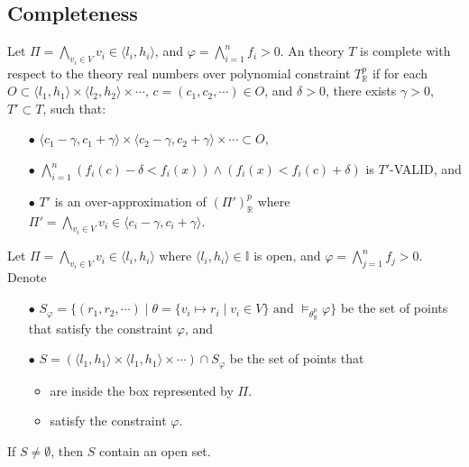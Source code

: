 \subsection{Completeness}
\begin{definition} \label{def:OT-complete}
\sloppy
Let $\Pi = \bigwedge\limits_{v_i \in V} v_i \in \langle l_i, h_i \rangle$, and ${\varphi = \bigwedge\limits_{i=1}^n f_i > 0}$. An theory $T$ is complete with respect to the theory real numbers over polynomial constraint $T^p_\mathbb{R}$ if for each ${O \subset \langle l_1, h_1 \rangle \times \langle l_2, h_2 \rangle \times \cdots}$, ${c = (c_1, c_2, \cdots) \in O}$, and $\delta > 0$, there exists $\gamma > 0$, $T' \subset T$, such that:
\begin{itemize}
\item[$\bullet$] $\langle c_1 - \gamma, c_1 + \gamma \rangle \times \langle c_2 - \gamma, c_2 + \gamma \rangle \times \cdots \subset O$,
\item[$\bullet$]$\bigwedge\limits_{i=1}^n(f_i(c)-\delta < f_i(x)) \wedge (f_i(x) < f_i(c) + \delta)$ is $T'$-VALID, and
\item[$\bullet$] $T'$ is an over-approximation of $(\Pi')^p_\mathbb{R}$ where ${\Pi' = \bigwedge\limits_{v_i \in V} v_i \in \langle c_i - \gamma, c_i + \gamma \rangle}$.
\end{itemize} 
\end{definition}

\begin{lemma} \label{lem:sat-complete}
Let $\Pi = \bigwedge\limits_{v_i \in V} v_i \in \langle l_i, h_i \rangle$ where $\langle l_i, h_i \rangle \in \mathbb{I}$ is open, and ${\varphi = \bigwedge\limits_{j = 1}^n f_j > 0}$. Denote 
\begin{itemize}
\item [$\bullet$] $S_\varphi = \{(r_1, r_2, \cdots) \mid \theta = \{v_i \mapsto r_i \mid v_i \in V \} \text{ and } \models_{\theta^p_\mathbb{R}}\varphi \}$ be the set of points that satisfy the constraint $\varphi$, and
\item [$\bullet$] $S = (\langle l_1, h_1 \rangle \times \langle l_1, h_1 \rangle \times \cdots) \cap S_\varphi$ be the set of points that
\begin{itemize}
\item  are inside the box represented by $\Pi$.
\item satisfy the constraint $\varphi$.
\end{itemize}

\end{itemize}
If $S \neq \emptyset$, then $S$ contain an open set.
\end{lemma}

